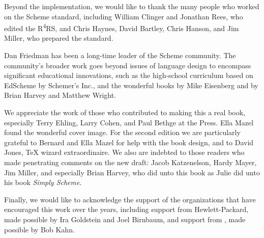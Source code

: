 Beyond the  implementation, we would like to thank the many people who worked on the  Scheme standard, including William Clinger and Jonathan Rees, who edited the R\textsuperscript{4}RS, and Chris Haynes, David Bartley, Chris Hanson, and Jim Miller, who prepared the  standard.

Dan Friedman has been a long-time leader of the Scheme community.
The community’s broader work goes beyond issues of language design to encompass significant educational innovations, such as the high-school curriculum based on EdScheme by Schemer’s Inc., and the wonderful books by Mike Eisenberg and by Brian Harvey and Matthew Wright.

We appreciate the work of those who contributed to making this a real book, especially Terry Ehling, Larry Cohen, and Paul Bethge at the  Press.
Ella Mazel found the wonderful cover image.
For the second edition we are particularly grateful to Bernard and Ella Mazel for help with the book design, and to David Jones, \TeX{} wizard extraordinaire.
We also are indebted to those readers who made penetrating comments on the new draft:
Jacob Katzenelson, Hardy Mayer, Jim Miller, and especially Brian Harvey, who did unto this book as Julie did unto his book \textit{Simply Scheme}.

Finally, we would like to acknowledge the support of the organizations that have encouraged this work over the years, including support from Hewlett-Packard, made possible by Ira Goldstein and Joel Birnbaum, and support from , made possible by Bob Kahn.
